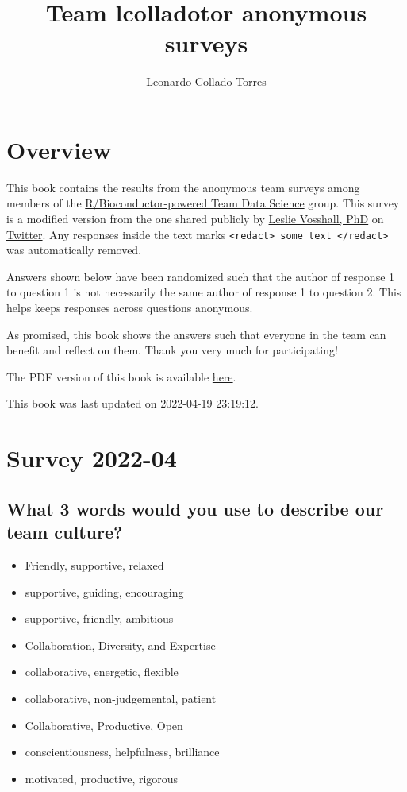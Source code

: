 \documentclass[
]{book}
\title{Team lcolladotor anonymous surveys}
\author{Leonardo Collado-Torres}
\date{}
\providecommand{\tightlist}{%
  \setlength{\itemsep}{0pt}\setlength{\parskip}{0pt}}
\begin{document}
\maketitle

{
\setcounter{tocdepth}{1}
\tableofcontents
}
\hypertarget{overview}{%
\chapter*{Overview}\label{overview}}

This book contains the results from the anonymous team surveys among members of the \href{https://lcolladotor.github.io/bioc_team_ds/}{R/Bioconductor-powered Team Data Science} group. This survey is a modified version from the one shared publicly by \href{https://twitter.com/leslievosshall}{Leslie Vosshall, PhD} on \href{https://twitter.com/leslievosshall/status/1371260850657460227?s=20}{Twitter}. Any responses inside the text marks \texttt{\textless{}redact\textgreater{}\ some\ text\ \textless{}/redact\textgreater{}} was automatically removed.

Answers shown below have been randomized such that the author of response 1 to question 1 is not necessarily the same author of response 1 to question 2. This helps keeps responses across questions anonymous.

As promised, this book shows the answers such that everyone in the team can benefit and reflect on them. Thank you very much for participating!

The PDF version of this book is available \href{_main.pdf}{here}.

This book was last updated on 2022-04-19 23:19:12.

\hypertarget{survey-2022-04}{%
\chapter{Survey 2022-04}\label{survey-2022-04}}

\hypertarget{what-3-words-would-you-use-to-describe-our-team-culture}{%
\section{What 3 words would you use to describe our team culture?}\label{what-3-words-would-you-use-to-describe-our-team-culture}}

\begin{itemize}
\tightlist
\item
  Friendly, supportive, relaxed
\item
  supportive, guiding, encouraging
\item
  supportive, friendly, ambitious
\item
  Collaboration, Diversity, and Expertise
\item
  collaborative, energetic, flexible
\item
  collaborative, non-judgemental, patient
\item
  Collaborative, Productive, Open
\item
  conscientiousness, helpfulness, brilliance
\item
  motivated, productive, rigorous
\end{itemize}
\end{document}
